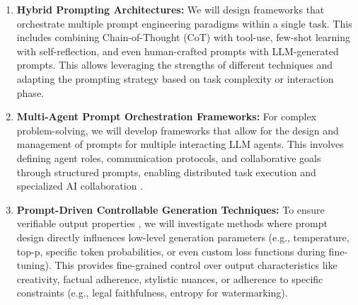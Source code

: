 \documentclass{article}
\begin{document}
\begin{enumerate}
    \item \textbf{Hybrid Prompting Architectures:} We will design frameworks that orchestrate multiple prompt engineering paradigms within a single task. This includes combining Chain-of-Thought (CoT) with tool-use, few-shot learning with self-reflection, and even human-crafted prompts with LLM-generated prompts. This allows leveraging the strengths of different techniques and adapting the prompting strategy based on task complexity or interaction phase.
    \item \textbf{Multi-Agent Prompt Orchestration Frameworks:} For complex problem-solving, we will develop frameworks that allow for the design and management of prompts for multiple interacting LLM agents. This involves defining agent roles, communication protocols, and collaborative goals through structured prompts, enabling distributed task execution and specialized AI collaboration \citep{paper1}.
    \item \textbf{Prompt-Driven Controllable Generation Techniques:} To ensure verifiable output properties \citep{paper3}, we will investigate methods where prompt design directly influences low-level generation parameters (e.g., temperature, top-p, specific token probabilities, or even custom loss functions during fine-tuning). This provides fine-grained control over output characteristics like creativity, factual adherence, stylistic nuances, or adherence to specific constraints (e.g., legal faithfulness, entropy for watermarking).
\end{enumerate}
\end{document}
